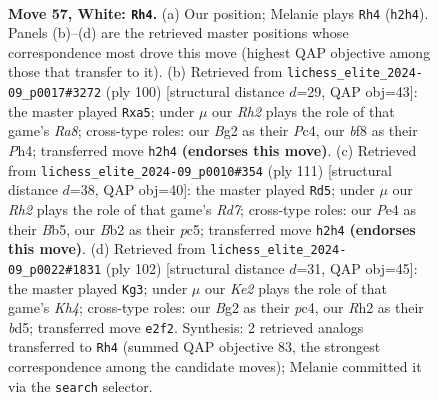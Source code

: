 \documentclass[11pt]{article}
\begin{document}
\clearpage

\begin{figure}[p]\centering
\begin{subfigure}{0.46\textwidth}\centering
\resizebox{\linewidth}{!}{%
\newchessgame
\chessboard[
  setfen={3r1b2/7p/p2p2k1/P3p2p/2P1P3/1n3P2/1B2K1BR/8 w - - 0 57},
  showmover=false,
  pgfstyle=straightmove, color=movearrow, markmove={h2-h4}
]}
\caption{}
\end{subfigure}\hfill
\begin{subfigure}{0.46\textwidth}\centering
\resizebox{\linewidth}{!}{%
\newchessgame
\chessboard[
  setfen={R7/4rk2/2p3p1/p6p/P1Pnp2P/1P6/6P1/3BK3 w - - 0 51},
  showmover=false,
  pgfstyle=straightmove, color=movearrow, markmove={a8-a5}
]}
\caption{}
\end{subfigure}
\\[4pt]
\begin{subfigure}{0.46\textwidth}\centering
\resizebox{\linewidth}{!}{%
\newchessgame
\chessboard[
  setfen={8/1p3kp1/8/1bP1B2p/p6P/P4PK1/1P1r2P1/2R5 b - - 47 56},
  showmover=false,
  pgfstyle=straightmove, color=movearrow, markmove={d2-d5}
]}
\caption{}
\end{subfigure}\hfill
\begin{subfigure}{0.46\textwidth}\centering
\resizebox{\linewidth}{!}{%
\newchessgame
\chessboard[
  setfen={8/3r2pk/R1p2p1p/3b3P/2p4K/2B2P2/1P4P1/8 w - - 17 52},
  showmover=false,
  pgfstyle=straightmove, color=movearrow, markmove={h4-g3}
]}
\caption{}
\end{subfigure}
\caption{\textbf{Move 57, White: \texttt{Rh4}.} (a) Our position; Melanie plays \texttt{Rh4} (\texttt{h2h4}). Panels (b)--(d) are the retrieved master positions whose correspondence most drove this move (highest QAP objective among those that transfer to it). (b) Retrieved from \texttt{lichess\_elite\_2024-09\_p0017\#3272} (ply 100) [structural distance $d$=29, QAP obj=43]: the master played \texttt{Rxa5}; under $\mu$ our \emph{Rh2} plays the role of that game's \emph{Ra8}; cross-type roles: our \emph{B}g2 as their \emph{P}c4, our \emph{b}f8 as their \emph{P}h4; transferred move \texttt{h2h4} \textbf{(endorses this move)}. (c) Retrieved from \texttt{lichess\_elite\_2024-09\_p0010\#354} (ply 111) [structural distance $d$=38, QAP obj=40]: the master played \texttt{Rd5}; under $\mu$ our \emph{Rh2} plays the role of that game's \emph{Rd7}; cross-type roles: our \emph{P}e4 as their \emph{B}b5, our \emph{B}b2 as their \emph{p}c5; transferred move \texttt{h2h4} \textbf{(endorses this move)}. (d) Retrieved from \texttt{lichess\_elite\_2024-09\_p0022\#1831} (ply 102) [structural distance $d$=31, QAP obj=45]: the master played \texttt{Kg3}; under $\mu$ our \emph{Ke2} plays the role of that game's \emph{Kh4}; cross-type roles: our \emph{B}g2 as their \emph{p}c4, our \emph{R}h2 as their \emph{b}d5; transferred move \texttt{e2f2}. Synthesis: 2 retrieved analogs transferred to \texttt{Rh4} (summed QAP objective 83, the strongest correspondence among the candidate moves); Melanie committed it via the \texttt{search} selector.}
\label{fig:thought-m112}
\end{figure}
\end{document}
